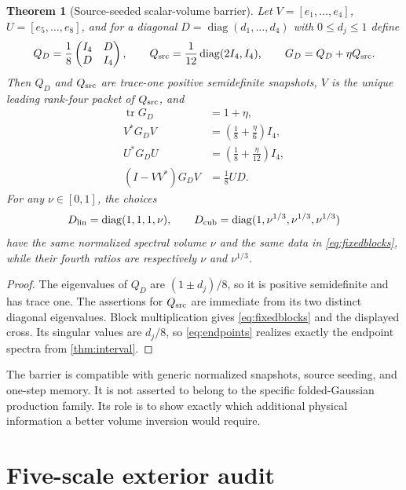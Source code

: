 \documentclass[11pt]{article}
\newtheorem{theorem}{Theorem}[section]
\theoremstyle{definition}
\theoremstyle{remark}
\newcommand{\tr}{\operatorname{tr}}
\newcommand{\diag}{\operatorname{diag}}
\begin{document}
\begin{theorem}[Source-seeded scalar-volume barrier]
\label{thm:sourcebarrier}
Let $V=[e_1,\ldots,e_4]$, $U=[e_5,\ldots,e_8]$, and for a diagonal
$D=\diag(d_1,\ldots,d_4)$ with $0\le d_j\le1$ define
\begin{equation}
 Q_D=\frac18
 \begin{pmatrix}I_4&D\\D&I_4\end{pmatrix},
 \qquad
 Q_{\rm src}=\frac1{12}\diag(2I_4,I_4),
 \qquad
 G_D=Q_D+\eta Q_{\rm src}.
 \label{eq:barrierfamily}
\end{equation}
Then $Q_D$ and $Q_{\rm src}$ are trace-one positive semidefinite snapshots,
$V$ is the unique leading rank-four packet of $Q_{\rm src}$, and
\begin{align}
 \tr G_D&=1+\eta,\nonumber\\
 V^*G_DV&=\left(\frac18+\frac\eta6\right)I_4,\nonumber\\
 U^*G_DU&=\left(\frac18+\frac\eta{12}\right)I_4,\label{eq:fixedblocks}\\
 (I-VV^*)G_DV&=\frac18UD.\nonumber
\end{align}
For any $\nu\in[0,1]$, the choices
\begin{equation}
 D_{\rm lin}=\diag(1,1,1,\nu),
 \qquad
 D_{\rm cub}=\diag(1,\nu^{1/3},\nu^{1/3},\nu^{1/3})
 \label{eq:endpoints}
\end{equation}
have the same normalized spectral volume $\nu$ and the same data in
\eqref{eq:fixedblocks}, while their fourth ratios are respectively
$\nu$ and $\nu^{1/3}$.
\end{theorem}

\begin{proof}
The eigenvalues of $Q_D$ are $(1\pm d_j)/8$, so it is positive semidefinite
and has trace one.  The assertions for $Q_{\rm src}$ are immediate from its
two distinct diagonal eigenvalues.  Block multiplication gives
\eqref{eq:fixedblocks} and the displayed cross.  Its singular values are
$d_j/8$, so \eqref{eq:endpoints} realizes exactly the endpoint spectra from
\cref{thm:interval}.
\end{proof}

The barrier is compatible with generic normalized snapshots, source seeding,
and one-step memory.  It is not asserted to belong to the specific
folded-Gaussian production family.  Its role is to show exactly which
additional physical information a better volume inversion would require.

\section{Five-scale exterior audit}
\label{sec:audit}
\end{document}
